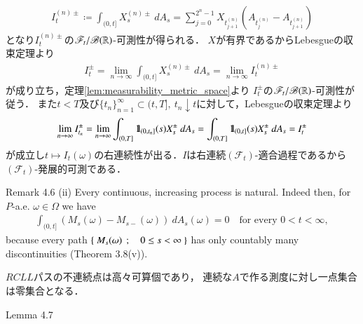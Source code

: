 \begin{prf}
\begin{align}
			I^{(n)\pm}_t \coloneqq \int_{(0,t]} X^{(n)\pm}_s\ dA_s
			= \sum_{j=0}^{2^n-1} X_{t^{(n)}_{j+1}} \left(A_{t^{(n)}_j} - A_{t^{(n)}_{j+1}}\right)
		\end{align}
		となり$I^{(n)\pm}_t$の$\mathscr{F}_t/\mathscr{B}(\mathbb{R})$-可測性が得られる．
		$X$が有界であるからLebesgueの収束定理より
		\begin{align}
			I^{\pm}_t = \lim_{n \to \infty} \int_{(0,t]} X^{(n)\pm}_s\ dA_s
			= \lim_{n \to \infty} I^{(n)\pm}_t
		\end{align}
		が成り立ち，定理\ref{lem:measurability_metric_space}より
		$I^{\pm}_t$の$\mathscr{F}_t/\mathscr{B}(\mathbb{R})$-可測性が従う．
		また$t<T$及び$\{t_n\}_{n=1}^\infty \subset (t,T],\ t_n \downarrow t$に対して，Lebesgueの収束定理より
		\begin{align}
			\lim_{n \to \infty} I^\pm_{t_n}
			= \lim_{n \to \infty} \int_{(0,T]} \mbox{1}\hspace{-0.25em}\mbox{l}_{(0,t_n]}(s)X^\pm_s\ dA_s
			= \int_{(0,T]} \mbox{1}\hspace{-0.25em}\mbox{l}_{(0,t]}(s)X^\pm_s\ dA_s
			= I^\pm_t
		\end{align}
		が成立し$t \longmapsto I_t(\omega)$の右連続性が出る．$I$は右連続$(\mathscr{F}_t)$-適合過程であるから
		$(\mathscr{F}_t)$-発展的可測である．
		\QED
	\end{prf}
	
	\begin{itembox}[l]{Remark 4.6 (ii)}
		Every continuous, increasing process is natural. Indeed then, for $P$-a.e. $\omega \in \Omega$
		we have
		\begin{align}
			\int_{(0,t]} (M_s(\omega)-M_{s-}(\omega))\ dA_s(\omega) = 0
			\quad \mbox{for every $0 < t < \infty$},
		\end{align}
		because every path $\left\{\ M_s(\omega)\ \, ; \quad 0 \leq s < \infty\ \right\}$ has only countably many discontinuities
		(Theorem 3.8(v)).
	\end{itembox}
	
	\begin{prf}
		$RCLL$パスの不連続点は高々可算個であり，
		連続な$A$で作る測度に対し一点集合は零集合となる．
		\QED
	\end{prf}
	
	\begin{itembox}[l]{Lemma 4.7}
		
	\end{itembox}
	
